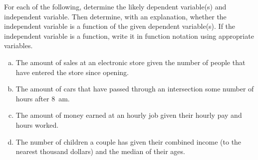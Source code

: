 \documentclass[11pt,letterpaper]{article}
\begin{document}
 For each of the following, determine the likely dependent variable(s) and independent variable. Then determine, with an explanation, whether the independent variable is a function of the given dependent variable(s). If the independent variable is a function, write it in function notation using appropriate variables. 
	\begin{enumerate}[(a)]
	\item The amount of sales at an electronic store given the number of people that have entered the store since opening. 
	\item The amount of cars that have passed through an intersection some number of hours after 8~am.
	\item The amount of money earned at an hourly job given their hourly pay and hours worked.
	\item The number of children a couple has given their combined income (to the nearest thousand dollars) and the median of their ages. 
	\end{enumerate} \pspace
\end{document}
